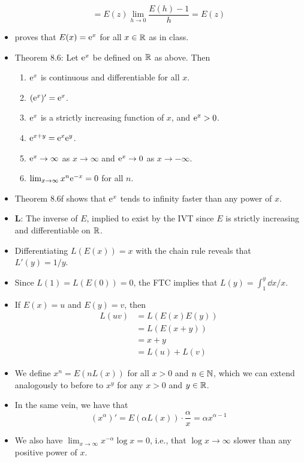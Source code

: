 \documentclass[../notes.tex]{subfiles}
\begin{document}
\begin{itemize}
\begin{equation*}
        = E(z)\lim_{h\to 0}\frac{E(h)-1}{h}
        = E(z)
    \end{equation*}
    \item \textcite{bib:Rudin} proves that $E(x)=\e[x]$ for all $x\in\R$ as in class.
    \item Theorem 8.6: Let $\e[x]$ be defined on $\R$ as above. Then
    \begin{enumerate}[label={(\alph*)}]
        \item $\e[x]$ is continuous and differentiable for all $x$.
        \item $(\e[x])'=\e[x]$.
        \item $\e[x]$ is a strictly increasing function of $x$, and $\e[x]>0$.
        \item $\e[x+y]=\e[x]\e[y]$.
        \item $\e[x]\to\infty$ as $x\to\infty$ and $\e[x]\to 0$ as $x\to -\infty$.
        \item $\lim_{x\to\infty}x^n\e[-x]=0$ for all $n$.
    \end{enumerate}
    \item Theorem 8.6f shows that $\e[x]$ tends to infinity faster than any power of $x$.
    \item $\bm{L}$: The inverse of $E$, implied to exist by the IVT since $E$ is strictly increasing and differentiable on $\R$.
    \item Differentiating $L(E(x))=x$ with the chain rule reveals that $L'(y)=1/y$.
    \item Since $L(1)=L(E(0))=0$, the FTC implies that $L(y)=\int_1^y\dd{x}/x$.
    \item If $E(x)=u$ and $E(y)=v$, then
    \begin{align*}
        L(uv) &= L(E(x)E(y))\\
        &= L(E(x+y))\\
        &= x+y\\
        &= L(u)+L(v)
    \end{align*}
    \item We define $x^n=E(nL(x))$ for all $x>0$ and $n\in\N$, which we can extend analogously to before to $x^y$ for any $x>0$ and $y\in\R$.
    \item In the same vein, we have that
    \begin{equation*}
        (x^\alpha)' = E(\alpha L(x))\cdot\frac{\alpha}{x}
        = \alpha x^{\alpha-1}
    \end{equation*}
    \item We also have $\lim_{x\to\infty}x^{-\alpha}\log x=0$, i.e., that $\log x\to\infty$ slower than any positive power of $x$.

\end{itemize}
\end{document}
